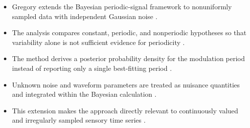 \documentclass[a4paper]{article}
\begin{document}
\begin{itemize}

    \item Gregory extends the Bayesian periodic-signal framework to nonuniformly sampled data with independent Gaussian noise \citep{gregory-1999-bayesian-periodic-signal-detection-i-analysis-of-20-years-of-radio-flux-measurements-of-the-x-ray-binary-ls-i-plus-61-303}.

    \item The analysis compares constant, periodic, and nonperiodic hypotheses so that variability alone is not sufficient evidence for periodicity \citep{gregory-1999-bayesian-periodic-signal-detection-i-analysis-of-20-years-of-radio-flux-measurements-of-the-x-ray-binary-ls-i-plus-61-303}.

    \item The method derives a posterior probability density for the modulation period instead of reporting only a single best-fitting period \citep{gregory-1999-bayesian-periodic-signal-detection-i-analysis-of-20-years-of-radio-flux-measurements-of-the-x-ray-binary-ls-i-plus-61-303}.

    \item Unknown noise and waveform parameters are treated as nuisance quantities and integrated within the Bayesian calculation \citep{gregory-1999-bayesian-periodic-signal-detection-i-analysis-of-20-years-of-radio-flux-measurements-of-the-x-ray-binary-ls-i-plus-61-303}.

    \item This extension makes the approach directly relevant to continuously valued and irregularly sampled sensory time series \citep{gregory-1999-bayesian-periodic-signal-detection-i-analysis-of-20-years-of-radio-flux-measurements-of-the-x-ray-binary-ls-i-plus-61-303}.

\end{itemize}




\end{document}
